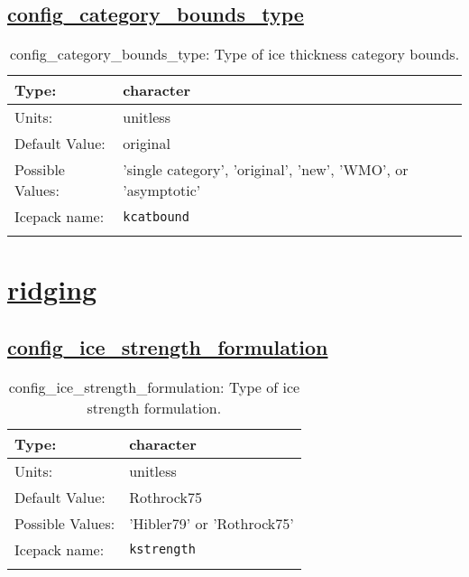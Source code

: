\subsection[config\_category\_bounds\_type]{\hyperref[sec:nm_tab_itd]{config\_category\_bounds\_type}}
\label{subsec:nm_sec_config_category_bounds_type}
\begin{center}
\begin{longtable}{| p{2.0in} || p{4.0in} |}
    \hline
    Type: & character \\
    \hline
    Units: & \si{unitless} \\
    \hline
    Default Value: & original \\
    \hline
    Possible Values: & 'single category', 'original', 'new', 'WMO', or 'asymptotic' \\
    \hline
    \hline
    Icepack name: & \verb+kcatbound+ \\
    \caption{config\_category\_bounds\_type: Type of ice thickness category bounds.}
\end{longtable}
\end{center}
\section[ridging]{\hyperref[sec:nm_tab_ridging]{ridging}}
\label{sec:nm_sec_ridging}
\subsection[config\_ice\_strength\_formulation]{\hyperref[sec:nm_tab_ridging]{config\_ice\_strength\_formulation}}
\label{subsec:nm_sec_config_ice_strength_formulation}
\begin{center}
\begin{longtable}{| p{2.0in} || p{4.0in} |}
    \hline
    Type: & character \\
    \hline
    Units: & \si{unitless} \\
    \hline
    Default Value: & Rothrock75 \\
    \hline
    Possible Values: & 'Hibler79' or 'Rothrock75' \\
    \hline
    \hline
    Icepack name: & \verb+kstrength+ \\
    \caption{config\_ice\_strength\_formulation: Type of ice strength formulation.}
\end{longtable}
\end{center}
